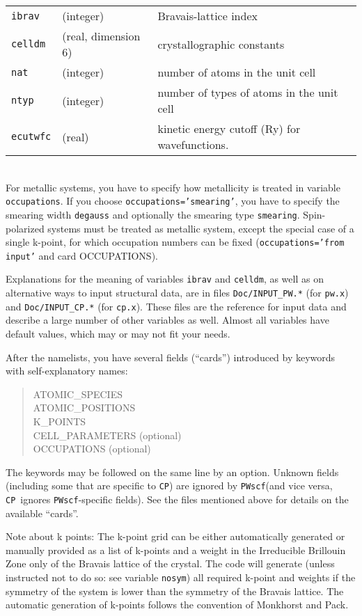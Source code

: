 \documentclass[12pt,a4paper]{article}
\def\pwx{\texttt{pw.x}}
\def\cpx{\texttt{cp.x}}
\def\PWscf{\texttt{PWscf}}
\def\CP{\texttt{CP}}
\begin{document}
\begin{tabular}{lll}
      \texttt{ibrav} & (integer)& Bravais-lattice index\\
      \texttt{celldm} &(real, dimension 6)& crystallographic constants\\
      \texttt{nat} &(integer)& number of atoms in the unit cell\\
      \texttt{ntyp} &(integer)& number of types of atoms in the unit cell\\
      \texttt{ecutwfc} &(real)& kinetic energy cutoff (Ry) for wavefunctions.
\end{tabular}    \\
For metallic systems, you have to specify how metallicity is treated
in
variable \texttt{occupations}. If you choose \texttt{occupations='smearing'},
you have
to specify the smearing width \texttt{degauss} and optionally the smearing
type
\texttt{smearing}. Spin-polarized systems must be treated as metallic system, except the 
special case of a single k-point, for which occupation numbers can be fixed
(\texttt{occupations='from input'} and card OCCUPATIONS).
    
Explanations for the meaning of variables \texttt{ibrav} and \texttt{celldm},
as well as on alternative ways to input structural data,
are in files \texttt{Doc/INPUT\_PW.*} (for \pwx) and \texttt{Doc/INPUT\_CP.*}
(for \cpx). These files are the reference for input data and describe 
a large number of other variables as well. Almost all variables have default 
values, which may or may not fit your needs.
    
After the namelists, you have several fields (``cards'')
introduced by keywords with self-explanatory names:
\begin{quote}
       ATOMIC\_SPECIES\\
       ATOMIC\_POSITIONS\\
       K\_POINTS\\
       CELL\_PARAMETERS (optional)\\
       OCCUPATIONS (optional)\\
\end{quote}
The keywords may be followed on the same line by an option. Unknown
fields (including some that are specific to \CP) are ignored by 
\PWscf (and vice versa, \CP\ ignores \PWscf-specific fields).
See the files mentioned above for details on the available ``cards''.
 
Note about k points: The k-point grid can be either automatically generated 
or manually provided as a list of k-points and a weight in the Irreducible
Brillouin Zone only of the Bravais lattice of the crystal. The code will 
generate (unless instructed not to do so: see variable \texttt{nosym}) all
required k-point 
and weights if the symmetry of the system is lower than the symmetry of the
Bravais lattice. The automatic generation of k-points follows the convention
of Monkhorst and Pack.
\end{document}
